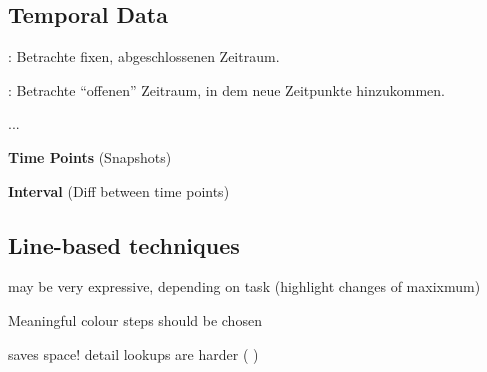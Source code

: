 \documentclass[10pt]{article} %
\begin{document}
\subsection{Temporal Data}
\begin{definition}
  \begin{cptitemize}
    \item {}: Betrachte fixen, abgeschlossenen
      Zeitraum.
    \item {}: Betrachte ``offenen'' Zeitraum, in
      dem neue Zeitpunkte hinzukommen.
  \end{cptitemize}
\end{definition}

\begin{definition}
  ...
\end{definition}

\begin{definition}[Methods]
  \begin{cptitemize}
    \item \textbf{Time Points} (Snapshots)
    \item \textbf{Interval} (Diff between time points)
  \end{cptitemize}
\end{definition}

\subsection{Line-based techniques}

\begin{definition} may be very expressive, depending on
task (highlight changes of maxixmum)
\end{definition} 

\begin{definition} 
 	  Meaningful colour steps should be chosen
 	  \begin{cptitemize} 
 	   	 \advantageit saves space!
 	   	 \disadvantageit detail lookups are harder (
 	   	 )
 	  \end{cptitemize} 
\end{definition} 
\end{document}
